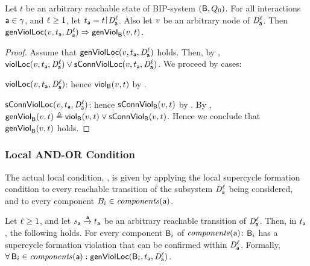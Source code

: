 \begin{proposition} \label{prop:locFromViol-implies-formViol}
\label{prop:locformviol-implies-formviol}
Let $t$ be an arbitrary reachable state of BIP-system $(\B, Q_0)$.
For all interactions $\act \in \gamma$, and $\l \ge 1$, let $t_\act = t \pj \dsk{\act}{\l}$.
Also let $\ndv$ be an arbitrary node of $\dsk{\act}{\l}$.
Then\\
\ind $ \locFormViol{v}{t_\act}{\act}{\l} \imp \genViol{v}{t}$.
\end{proposition}
%
\begin{proof}
Assume that $\locFormViol{v}{t_\act}{\act}{\l}$ holds. Then, by ,
$\scVL{v}{t_\act}{\act}{\l} \lor \locConnViol{v}{t_\act}{\act}{\l}$.
We proceed by cases:
\bn
\item $\scVL{v}{t_\act}{\act}{\l}$: hence $\scV{v}{t}$ by .
\item $\locConnViol{v}{t_\act}{\act}{\l}$: hence $\connViol{v}{t}$ by .
\en
By ,  $\genViol{v}{t}  \df \scV{v}{t}  \lor \connViol{v}{t}$.
Hence we conclude that $\genViol{v}{t}$ holds.
\end{proof}




\subsubsection{Local AND-OR Condition}

The actual local condition, \LAO, is given by applying the local supercycle formation condition to every reachable transition 
of the subsystem $\dsk{\act}{\l}$ being considered, and to every component $B_i \in \cmps{\act}$.

\begin{definition} \label{def:lao}
Let $\l \ge 1$, and let $s_\act \goesto[\act] t_\act$ be an arbitrary reachable transition of $\dsk{\act}{\l}$.
Then, in $t_\act$, the following holds. 
For every component $\B_i$ of $\cmps{\act}$:  
$\B_i$ has a supercycle formation violation that can be confirmed within $\dsk{\act}{\l}$.
Formally,\\
\ind  $\fa \B_i \in \cmps{\act} : \locFormViol{\B_i}{t_\act}{\act}{\l}$.
\end{definition}
%

